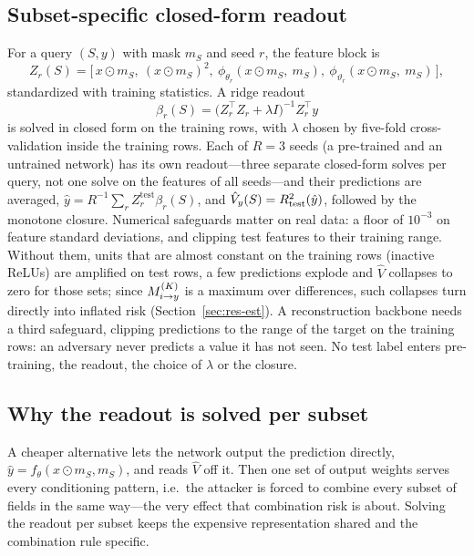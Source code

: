 \subsection{Subset-specific closed-form readout}
For a query $(S,y)$ with mask $m_S$ and seed $r$, the feature block is
\begin{equation}
Z_{r}(S) = \big[\, x\odot m_S,\ (x \odot m_S)^{2},\ \phi_{\theta_r}(x\odot m_S,\ m_S),\ \phi_{\vartheta_r}(x\odot m_S,\ m_S) \,\big],
\end{equation}
standardized with training statistics. A ridge readout
\begin{equation}\label{eq:ridge}
\beta_{r}(S) = \big(Z_r^{\top} Z_r + \lambda I\big)^{-1} Z_r^{\top} y
\end{equation}
is solved in closed form on the training rows, with $\lambda$ chosen by five-fold
cross-validation inside the training rows. Each of $R=3$ seeds (a pre-trained and an untrained network) has its own
readout---three separate closed-form solves per query, not one solve on the features of all seeds---and their
predictions are averaged, $\hat y = R^{-1}\sum_r Z_r^{\mathrm{test}}\beta_r(S)$, and
$\hat V_y(S)=R^{2}_{\mathrm{test}}(\hat y)$, followed by the monotone closure. Numerical
safeguards matter on real data: a floor of $10^{-3}$ on feature standard deviations, and
clipping test features to their training range. Without them, units that are almost constant
on the training rows (inactive ReLUs) are amplified on test rows, a few predictions explode and
$\hat V$ collapses to zero for those sets; since $M^{(K)}_{i \to y}$ is a maximum over differences, such
collapses turn directly into inflated risk (Section~\ref{sec:res-est}). A reconstruction backbone
needs a third safeguard, clipping predictions to the range of the target on the training rows: an adversary never
predicts a value it has not seen. No test label enters
pre-training, the readout, the choice of $\lambda$ or the closure.

\subsection{Why the readout is solved per subset}
A cheaper alternative lets the network output the prediction directly, $\hat y=f_\theta(x\odot
m_S, m_S)$, and reads $\hat V$ off it. Then one set of output weights serves every
conditioning pattern, i.e.\ the attacker is forced to combine every subset of fields in the
same way---the very effect that combination risk is about. Solving the readout per subset
keeps the expensive representation shared and the combination rule specific.

